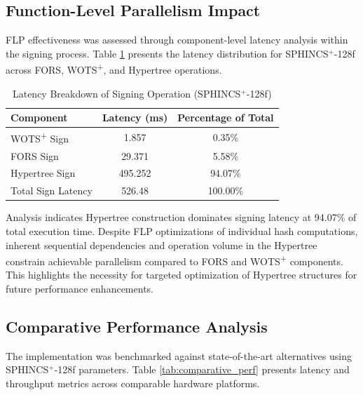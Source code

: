 \documentclass[journal]{IEEEtran}
\begin{document}
\subsection{Function-Level Parallelism Impact}

FLP effectiveness was assessed through component-level latency analysis within the signing process. Table \ref{tab:flp_impact} presents the latency distribution for SPHINCS$^+$-128f across FORS, WOTS\textsuperscript{+}, and Hypertree operations.

\begin{table}[h]
  \centering
  \caption{Latency Breakdown of Signing Operation (SPHINCS$^+$-128f)}
  \label{tab:flp_impact}
  \begin{tabular}{@{}lcc@{}}
    \toprule
    \textbf{Component} & \textbf{Latency (ms)} & \textbf{Percentage of Total} \\
    \midrule
    WOTS\textsuperscript{+} Sign & 1.857 & 0.35\% \\
    FORS Sign & 29.371 & 5.58\% \\
    Hypertree Sign & 495.252 & 94.07\% \\
    \midrule
    Total Sign Latency & 526.48 & 100.00\% \\
    \bottomrule
  \end{tabular}
\end{table}

Analysis indicates Hypertree construction dominates signing latency at 94.07\% of total execution time. Despite FLP optimizations of individual hash computations, inherent sequential dependencies and operation volume in the Hypertree constrain achievable parallelism compared to FORS and WOTS\textsuperscript{+} components. This highlights the necessity for targeted optimization of Hypertree structures for future performance enhancements.

\subsection{Comparative Performance Analysis}

The implementation was benchmarked against state-of-the-art alternatives using SPHINCS$^+$-128f parameters. Table \ref{tab:comparative_perf} presents latency and throughput metrics across comparable hardware platforms.
\end{document}
